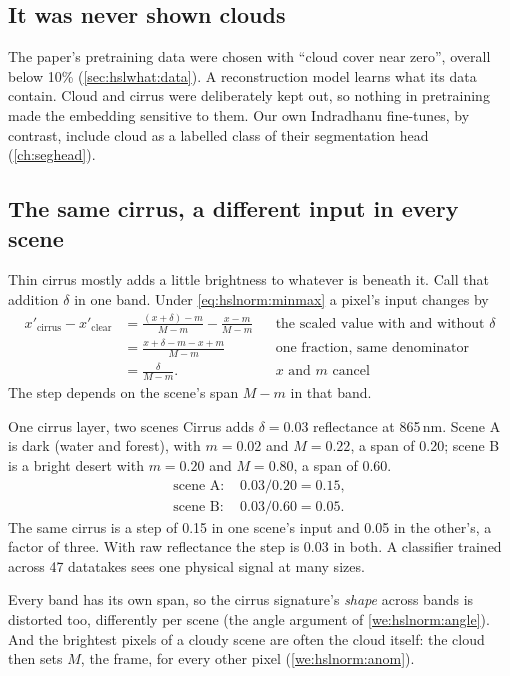 \subsection{It was never shown clouds}

The paper's pretraining data were chosen with ``cloud cover near zero'', overall below 10\% (\cref{sec:hslwhat:data}). A
reconstruction model learns what its data contain. Cloud and cirrus were deliberately kept out, so nothing in pretraining
made the embedding sensitive to them. Our own Indradhanu fine-tunes, by contrast, include cloud as a labelled class of their
segmentation head (\cref{ch:seghead}).

\subsection{The same cirrus, a different input in every scene}

Thin cirrus mostly adds a little brightness to whatever is beneath it\tagA. Call that addition $\delta$ in one band. Under
\cref{eq:hslnorm:minmax} a pixel's input changes by
\begin{align*}
x'_{\text{cirrus}}-x'_{\text{clear}} &= \frac{(x+\delta)-m}{M-m}-\frac{x-m}{M-m} && \text{the scaled value with and without }\delta\\
&= \frac{x+\delta-m-x+m}{M-m} && \text{one fraction, same denominator}\\
&= \frac{\delta}{M-m}. && x\text{ and }m\text{ cancel}
\end{align*}
The step depends on the scene's span $M-m$ in that band.

\begin{worked}[label={we:hslcloud:span}]{One cirrus layer, two scenes}
Cirrus adds $\delta=0.03$ reflectance at 865\,nm\tagA. Scene A is dark (water and forest), with $m=0.02$ and $M=0.22$, a span
of 0.20; scene B is a bright desert with $m=0.20$ and $M=0.80$, a span of 0.60\tagA.
\begin{align*}
\text{scene A: } & 0.03/0.20 = 0.15,\\
\text{scene B: } & 0.03/0.60 = 0.05 .
\end{align*}
The same cirrus is a step of 0.15 in one scene's input and 0.05 in the other's, a factor of three. With raw reflectance the
step is 0.03 in both. A classifier trained across 47 datatakes sees one physical signal at many sizes.
\end{worked}

Every band has its own span, so the cirrus signature's \emph{shape} across bands is distorted too, differently per scene
(the angle argument of \cref{we:hslnorm:angle}). And the brightest pixels of a cloudy scene are often the cloud itself: the
cloud then sets $M$, the frame, for every other pixel (\cref{we:hslnorm:anom}).


